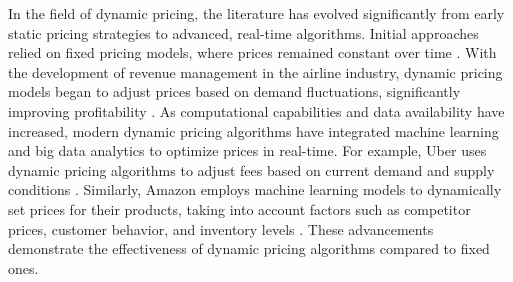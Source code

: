 \documentclass[12pt]{book}
\begin{document}





In the field of dynamic pricing, the literature has evolved significantly from early static pricing strategies to advanced, real-time algorithms. Initial approaches relied on fixed pricing models, where prices remained constant over time \citep{scrimitore2014quantity}. With the development of revenue management in the airline industry, dynamic pricing models began to adjust prices based on demand fluctuations, significantly improving profitability \citep{belobaba1989or}. As computational capabilities and data availability have increased, modern dynamic pricing algorithms have integrated machine learning and big data analytics to optimize prices in real-time. For example, Uber uses dynamic pricing algorithms to adjust fees based on current demand and supply conditions \citep{cachon2017role}. Similarly, Amazon employs machine learning models to dynamically set prices for their products, taking into account factors such as competitor prices, customer behavior, and inventory levels \citep{chen2016empirical}. These advancements demonstrate the effectiveness of dynamic pricing algorithms compared to fixed ones.
\end{document}
